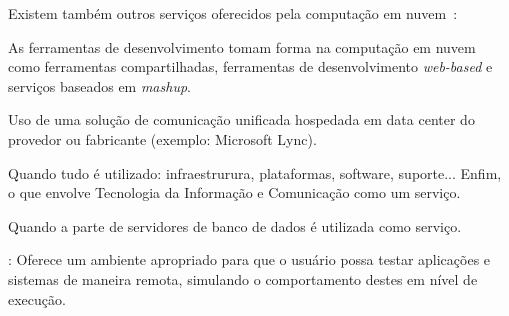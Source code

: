 Existem também outros serviços oferecidos pela computação em 
nuvem~\cite{informatica}:

\begin{itemise}

     As ferramentas de desenvolvimento tomam
    forma na computação em nuvem como ferramentas compartilhadas, ferramentas de
    desenvolvimento \emph{web-based} e serviços baseados em \emph{mashup}. 

     Uso de uma solução de comunicação unificada
    hospedada em data center do provedor ou fabricante (exemplo: Microsoft Lync). 

     Quando tudo é utilizado: infraestrurura,
    plataformas, software, suporte... Enfim, o que envolve Tecnologia da Informação e
    Comunicação como um serviço. 

     Quando a parte de servidores de banco de dados
    é utilizada como serviço.

    : Oferece um ambiente apropriado para que o usuário
    possa testar aplicações e sistemas de maneira remota, simulando o comportamento destes
    em nível de execução.

\end{itemise}

\undef\itemm

